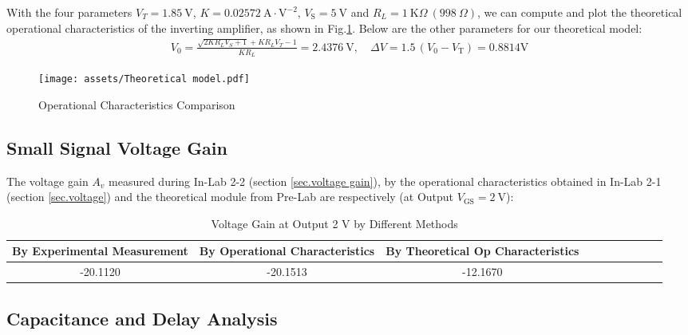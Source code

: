 \documentclass[UTF8]{article}
\def\KO{\ \mathrm{K}\Omega}
\def\KO{\ \mathrm{K}\Omega}
\theoremstyle{MyLineTheoremStyle} %
\theoremstyle{MyBlockTheoremStyle} %
\theoremstyle{MySubsubsectionStyle} %
\begin{document}
With the four parameters $V_T = 1.85 \ \mathrm{V}$, $K = 0.02572 \ \mathrm{A\cdot V^{-2}}$, $V_\text{S} = 5 \ \mathrm{V}$ and $R_L = 1 \KO\ (998 \ \Omega)$, we can compute and plot the theoretical operational characteristics of the inverting amplifier, as shown in Fig.\ref{Operational Characteristics Comparison}. Below are the other parameters for our theoretical model:
\begin{gather}
V_0 = \frac{\sqrt{ 2KR_LV_S + 1 } + KR_L V_T - 1}{K R_L} = 2.4376 \ \mathrm{V},\quad \Delta V = 1.5\, (V_0 - V_\text{T}) = 0.8814 \mathrm{V}
\end{gather}
\begin{figure}[H]\centering
    \texttt{[image: assets/Theoretical model.pdf]}
    \caption{Operational Characteristics Comparison}
    \label{Operational Characteristics Comparison}
\end{figure}


\subsection{Small Signal Voltage Gain}
The voltage gain $A_v$ measured during In-Lab 2-2 (section \ref{sec.voltage gain}), by the operational characteristics obtained in In-Lab 2-1 (section \ref{sec.voltage}) and the theoretical module from Pre-Lab are respectively (at Output $V_\text{GS} = 2 \ \mathrm{V}$):
\begin{table}[H]\centering
    \caption{Voltage Gain at Output 2 V by Different Methods}
    \label{Voltage Gain by Different Methods}
\begin{tabular}{cccccccccc}\toprule
    By Experimental Measurement & By Operational Characteristics & By Theoretical Op Characteristics \\
    \midrule
    -20.1120 & -20.1513 & -12.1670  \\
    \bottomrule
\end{tabular}
\end{table}

\subsection{Capacitance and Delay Analysis}
\end{document}
